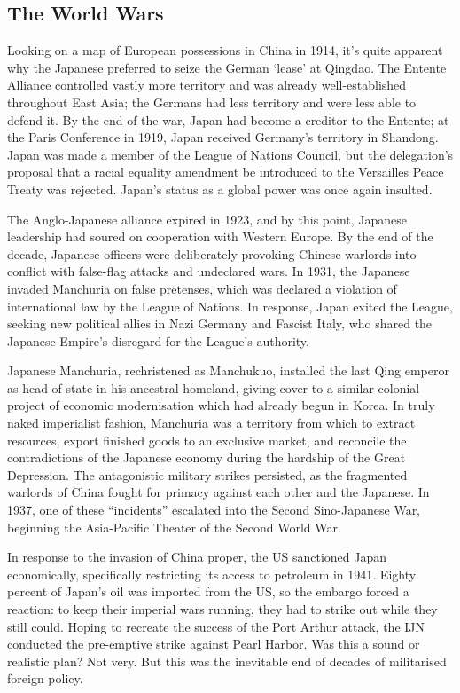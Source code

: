\documentclass[letterpaper,12pt,twoside]{article} %
\begin{document}
\begin{multicols}{2}
\subsection{The World Wars}

Looking on a map of European possessions in China in 1914, it's quite apparent why the Japanese preferred to seize the German `lease' at Qingdao. The Entente Alliance controlled vastly more territory and was already well-established throughout East Asia; the Germans had less territory and were less able to defend it. By the end of the war, Japan had become a creditor to the Entente; at the Paris Conference in 1919, Japan received Germany's territory in Shandong. Japan was made a member of the League of Nations Council, but the delegation's proposal that a racial equality amendment be introduced to the Versailles Peace Treaty was rejected. Japan's status as a global power was once again insulted.

The Anglo-Japanese alliance expired in 1923, and by this point, Japanese leadership had soured on cooperation with Western Europe. By the end of the decade, Japanese officers were deliberately provoking Chinese warlords into conflict with false-flag attacks and undeclared wars. In 1931, the Japanese invaded Manchuria on false pretenses, which was declared a violation of international law by the League of Nations. In response, Japan exited the League, seeking new political allies in Nazi Germany and Fascist Italy, who shared the Japanese Empire's disregard for the League's authority.

Japanese Manchuria, rechristened as Manchukuo, installed the last Qing emperor as head of state in his ancestral homeland, giving cover to a similar colonial project of economic modernisation which had already begun in Korea. In truly naked imperialist fashion, Manchuria was a territory from which to extract resources, export finished goods to an exclusive market, and reconcile the contradictions of the Japanese economy during the hardship of the Great Depression. The antagonistic military strikes persisted, as the fragmented warlords of China fought for primacy against each other and the Japanese. In 1937, one of these ``incidents'' escalated into the Second Sino-Japanese War, beginning the Asia-Pacific Theater of the Second World War.

In response to the invasion of China proper, the US sanctioned Japan economically, specifically restricting its access to petroleum in 1941. Eighty percent of Japan's oil was imported from the US, so the embargo forced a reaction: to keep their imperial wars running, they had to strike out while they still could. Hoping to recreate the success of the Port Arthur attack, the IJN conducted the pre-emptive strike against Pearl Harbor. Was this a sound or realistic plan? Not very. But this was the inevitable end of decades of militarised foreign policy.


\end{multicols}
\end{document}
